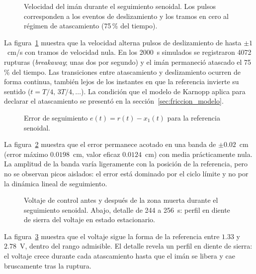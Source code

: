 \begin{figure}[ht]
    \centering
    
    \caption[Seguimiento senoidal: velocidad]{Velocidad del imán durante el seguimiento senoidal. Los pulsos corresponden a los eventos de deslizamiento y los tramos en cero al régimen de atascamiento (75\,\% del tiempo).}
    \label{fig:sen_vel}
\end{figure}

La figura~\ref{fig:sen_vel} muestra que la velocidad alterna pulsos de deslizamiento de hasta $\pm 1$~cm/s con tramos de velocidad nula. En los 2000~s simulados se registraron 4072 rupturas (\emph{breakaway}; unas dos por segundo) y el imán permaneció atascado el 75\,\% del tiempo. Las transiciones entre atascamiento y deslizamiento ocurren de forma continua, también lejos de los instantes en que la referencia invierte su sentido ($t = T/4,\,3T/4,\ldots$). La condición que el modelo de Karnopp aplica para declarar el atascamiento se presentó en la sección~\ref{sec:friccion_modelo}.

\FloatBarrier

\begin{figure}[ht]
    \centering
    
    \caption[Seguimiento senoidal: error]{Error de seguimiento $e(t)=r(t)-x_1(t)$ para la referencia senoidal.}
    \label{fig:sen_error}
\end{figure}

La figura~\ref{fig:sen_error} muestra que el error permanece acotado en una banda de $\pm 0.02$~cm (error máximo $0.0198$~cm, valor eficaz $0.0124$~cm) con media prácticamente nula. La amplitud de la banda varía ligeramente con la posición de la referencia, pero no se observan picos aislados: el error está dominado por el ciclo límite y no por la dinámica lineal de seguimiento.

\FloatBarrier

\begin{figure}[ht]
    \centering
    
    \caption[Seguimiento senoidal: señal de control]{Voltaje de control antes y después de la zona muerta durante el seguimiento senoidal. Abajo, detalle de 244 a 256~s: perfil en diente de sierra del voltaje en estado estacionario.}
    \label{fig:sen_ctrl}
\end{figure}

La figura~\ref{fig:sen_ctrl} muestra que el voltaje sigue la forma de la referencia entre $1.33$ y $2.78$~V, dentro del rango admisible. El detalle revela un perfil en diente de sierra: el voltaje crece durante cada atascamiento hasta que el imán se libera y cae bruscamente tras la ruptura.

